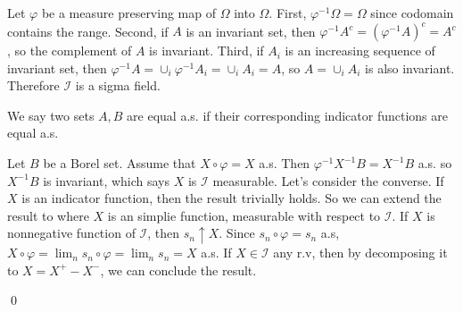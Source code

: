 \begin{problem}[6.1.1] \hfill
	
	Let $\varphi$ be a measure preserving map of $\Omega$ into $\Omega$.
	First, $\varphi^{-1}\Omega = \Omega$ since codomain contains the range.
	Second, if $A$ is an invariant set, then $\varphi^{-1}A^c = \left( \varphi^{-1}A \right)^c = A^c$, so the complement of $A$ is invariant.
	Third, if $A_i$ is an increasing sequence of invariant set, then $\varphi^{-1}A = \cup_i \varphi^{-1}A_i = \cup_i A_i = A$, so $A = \cup_i A_i$ is also invariant.
	Therefore $\mathcal{I}$ is a sigma field.

	We say two sets $A, B$ are equal a.s. if their corresponding indicator functions are equal a.s.

	Let $B$ be a Borel set.
	Assume that $X \circ \varphi = X$ a.s.
	Then $\varphi^{-1}X^{-1}B = X^{-1}B$ a.s. so $X^{-1}B$ is invariant,
	which says $X$ is $\mathcal{I}$ measurable.
	Let's consider the converse.
	If $X$ is an indicator function, then the result trivially holds.
	So we can extend the result to where $X$ is an simplie function, measurable with respect to $\mathcal{I}$.
	If $X$ is nonnegative function of $\mathcal{I}$, then $s_n \uparrow X$.
	Since $s_n \circ \varphi = s_n$ a.s, $X\circ \varphi = \lim_n s_n \circ \varphi = \lim_n s_n = X$ a.s.
	If $X \in \mathcal{I}$ any r.v, then by decomposing it to $X = X^+ - X^-$, we can conclude the result.

	\qed
\end{problem}

